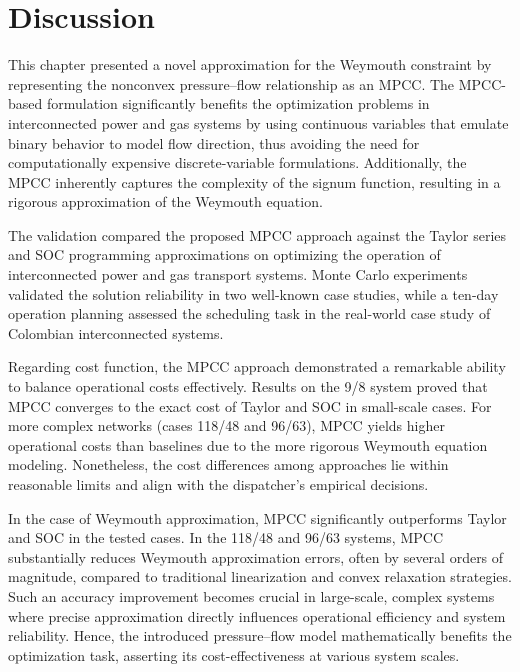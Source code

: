 \section{Discussion} \label{sec: conclusion}


This chapter presented a novel approximation for the Weymouth constraint by representing the nonconvex pressure--flow relationship as an MPCC. The MPCC-based formulation significantly benefits the optimization problems in interconnected power and gas systems by using continuous variables that emulate binary behavior to model flow direction, thus avoiding the need for computationally expensive discrete-variable formulations. Additionally, the MPCC inherently captures the complexity of the signum function, resulting in a rigorous approximation of the Weymouth equation.


The validation compared the proposed MPCC approach against the Taylor series and SOC programming approximations on optimizing the operation of interconnected power and gas transport systems. Monte Carlo experiments validated the solution reliability in two well-known case studies, while a ten-day operation planning assessed the scheduling task in the real-world case study of Colombian interconnected systems.

Regarding cost function, the MPCC approach demonstrated a remarkable ability to balance operational costs effectively. Results on the  9/8 system proved that MPCC converges to the exact cost of Taylor and SOC in small-scale cases. For more complex networks (cases 118/48 and 96/63), MPCC yields higher operational costs than baselines due to the more rigorous Weymouth equation modeling. Nonetheless, the cost differences among approaches lie within reasonable limits and align with the dispatcher's empirical decisions.

In the case of Weymouth approximation, MPCC significantly outperforms Taylor and SOC in the tested cases. In the 118/48 and 96/63 systems, MPCC substantially reduces Weymouth approximation errors, often by several orders of magnitude, compared to traditional linearization and convex relaxation strategies. Such an accuracy improvement becomes crucial in large-scale, complex systems where precise approximation directly influences operational efficiency and system reliability. Hence, the introduced pressure--flow model mathematically benefits the optimization task, asserting its cost-effectiveness at various system scales.

